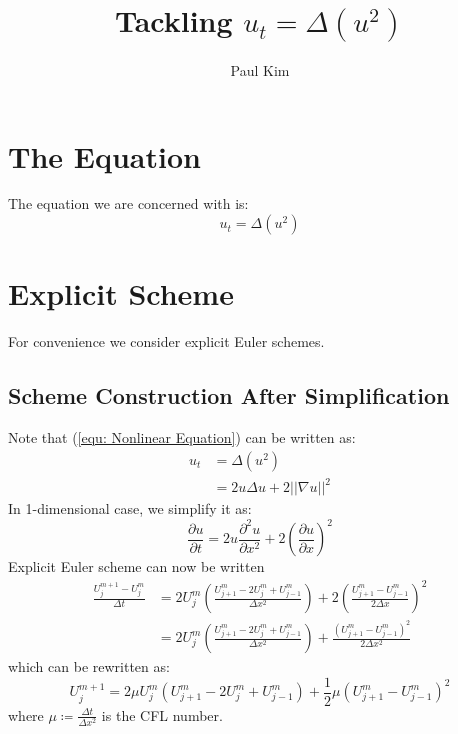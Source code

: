 \documentclass[a4paper]{article}
\title{Tackling $u_{t} = \Delta \left( u^2 \right)$}
\author{Paul Kim}
\begin{document}
\maketitle
\section{The Equation}
The equation we are concerned with is:
\begin{equation}
    u_{t} = \Delta \left( u^2 \right)
    \label{equ: Nonlinear Equation}
\end{equation}

\section{Explicit Scheme}
For convenience we consider explicit Euler schemes.

\subsection{Scheme Construction After Simplification}
Note that (\ref{equ: Nonlinear Equation}) can be written as:
\begin{align}
    u_t &= \Delta \left( u^2 \right) \\
    &= 2 u \Delta u + 2 || \nabla u ||^2
\end{align}
In 1-dimensional case, we simplify it as:
\begin{equation}
    \frac{\partial u}{\partial t} = 2 u \frac{\partial^2 u}{\partial x^2} + 2 \left( \frac{\partial u}{\partial x} \right)^2
\end{equation}
Explicit Euler scheme can now be written
\begin{align}
    \frac{U_j^{m+1} - U_j^m}{\Delta t}
    &= 2 U_j^m \left( \frac{U_{j+1}^m - 2 U_{j}^m + U_{j-1}^m}{\Delta x^2} \right)
    + 2 \left( \frac{U_{j+1}^m - U_{j-1}^m}{2 \Delta x} \right)^2 \\
    &= 2 U_j^m \left( \frac{U_{j+1}^m - 2 U_{j}^m + U_{j-1}^m}{\Delta x^2} \right)
    + \frac{\left( U_{j+1}^m - U_{j-1}^m \right)^2}{2 \Delta x^2}
\end{align}
which can be rewritten as:
\begin{equation}
    U_j^{m+1} = 2 \mu U_j^m \left( U_{j+1}^m - 2 U_{j}^m + U_{j-1}^m \right) 
    + \frac{1}{2} \mu \left( U_{j+1}^m - U_{j-1}^m \right)^2
\end{equation}
where $\mu \coloneqq \frac{\Delta t}{\Delta x^2}$ is the CFL number.
\end{document}
